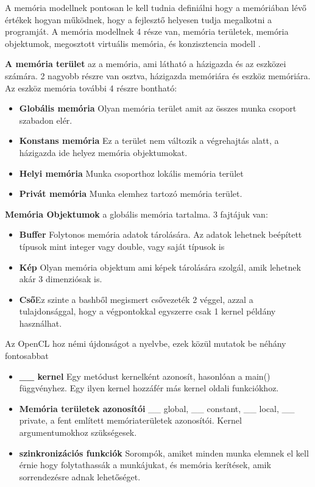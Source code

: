 A memória modellnek pontosan le kell tudnia definiálni hogy a memóriában lévő értékek hogyan működnek, hogy a fejlesztő helyesen tudja megalkotni a programját. A memória modellnek 4 része van, memória területek, memória objektumok, megosztott virtuális memória, és konzisztencia modell \cite{spec_mem}.

\textbf{A memória terület} az a memória, ami látható a házigazda és az eszközei számára. 2 nagyobb részre van osztva, házigazda memóriára és eszköz memóriára. Az eszköz memória további 4 részre bontható:
\begin{itemize}
\item\textbf{Globális memória} Olyan memória terület amit az összes munka csoport szabadon elér.
\item\textbf{Konstans memória} Ez a terület nem változik a végrehajtás alatt, a házigazda ide helyez memória objektumokat.
\item\textbf{Helyi memória} Munka csoporthoz lokális memória terület
\item\textbf{Privát memória} Munka elemhez tartozó memória terület.
\end{itemize}
\textbf{Memória Objektumok} a globális memória tartalma. 3 fajtájuk van:
\begin{itemize}
\item\textbf{Buffer} Folytonos memória adatok tárolására. Az adatok lehetnek beépített típusok mint integer vagy double, vagy saját típusok is
\item\textbf{Kép} Olyan memória objektum ami képek tárolására szolgál, amik lehetnek akár 3 dimenziósak is.
\item\textbf{Cső}Ez szinte a bashből megismert csővezeték 2 véggel, azzal a tulajdonsággal, hogy a végpontokkal egyszerre csak 1 kernel példány használhat.
\end{itemize}

Az OpenCL hoz némi újdonságot a nyelvbe, ezek közül mutatok be néhány fontosabbat \cite{opencl_c}
\begin{itemize}
\item\textbf{\_\_ kernel} Egy metódust kernelként azonosít, hasonlóan a main() függvényhez. Egy ilyen kernel hozzáfér más kernel oldali funkciókhoz.
\item\textbf{Memória területek azonosítói} \_\_ global, \_\_ constant, \_\_ local, \_\_ private, a fent említett memóriaterületek azonosítói. Kernel argumentumokhoz szükségesek.
\item\textbf{szinkronizációs funkciók} Sorompók, amiket minden munka elemnek el kell érnie hogy folytathassák a munkájukat, és memória kerítések, amik sorrendezésre adnak lehetőséget.
\end{itemize}

